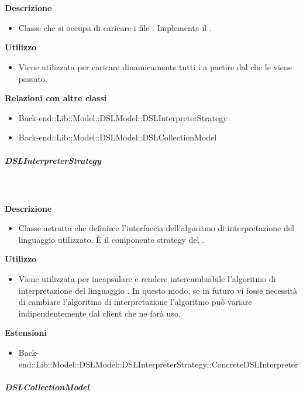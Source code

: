 				\textbf{\\ \\ Descrizione} 
					\begin{itemize}
						\item[] Classe che si occupa di caricare i file . Implementa il  .
					\end{itemize}      
				\textbf{Utilizzo}  
					\begin{itemize}
						\item[] Viene utilizzata per caricare dinamicamente tutti i  a partire dal  che le viene passato.
					\end{itemize}
					\textbf{Relazioni con altre classi}
					\begin{itemize}
							\item{Back-end::Lib::Model::DSLModel::DSLInterpreterStrategy}
							\item{Back-end::Lib::Model::DSLModel::DSLCollectionModel}
					\end{itemize}
			\subparagraph{DSLInterpreterStrategy}
				
				\textbf{\\ \\ Descrizione} 
					\begin{itemize}
						\item[] Classe astratta che definisce l'interfaccia dell'algoritmo di interpretazione del linguaggio  utilizzato. È il componente strategy del  .
					\end{itemize}      
				\textbf{Utilizzo}  
					\begin{itemize}
						\item[] Viene utilizzata per incapsulare e rendere intercambiabile l'algoritmo di interpretazione del linguaggio . In questo modo, se in futuro vi fosse necessità di cambiare l'algoritmo di interpretazione l'algoritmo può variare indipendentemente dal client che ne farà uso.
					\end{itemize}
					\textbf{Estensioni}
					\begin{itemize}
							\item{Back-end::Lib::Model::DSLModel::DSLInterpreterStrategy::ConcreteDSLInterpreter}
					\end{itemize}
			\subparagraph{DSLCollectionModel}
				
